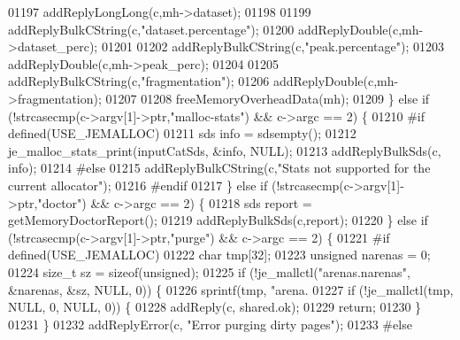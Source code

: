 \begin{DoxyCode}
{{{{01197         addReplyLongLong(c,mh->dataset);
01198 
01199         addReplyBulkCString(c,\textcolor{stringliteral}{"dataset.percentage"});
01200         addReplyDouble(c,mh->dataset\_perc);
01201 
01202         addReplyBulkCString(c,\textcolor{stringliteral}{"peak.percentage"});
01203         addReplyDouble(c,mh->peak\_perc);
01204 
01205         addReplyBulkCString(c,\textcolor{stringliteral}{"fragmentation"});
01206         addReplyDouble(c,mh->fragmentation);
01207 
01208         freeMemoryOverheadData(mh);
01209     \} \textcolor{keywordflow}{else} \textcolor{keywordflow}{if} (!strcasecmp(c->argv[1]->ptr,\textcolor{stringliteral}{"malloc-stats"}) && c->argc == 2) \{
01210 \textcolor{preprocessor}{#}\textcolor{preprocessor}{if} \textcolor{preprocessor}{defined}\textcolor{preprocessor}{(}\textcolor{preprocessor}{USE\_JEMALLOC}\textcolor{preprocessor}{)}
01211         sds info = sdsempty();
01212         je\_malloc\_stats\_print(inputCatSds, &info, NULL);
01213         addReplyBulkSds(c, info);
01214 \textcolor{preprocessor}{#}\textcolor{preprocessor}{else}
01215         addReplyBulkCString(c,\textcolor{stringliteral}{"Stats not supported for the current allocator"});
01216 \textcolor{preprocessor}{#}\textcolor{preprocessor}{endif}
01217     \} \textcolor{keywordflow}{else} \textcolor{keywordflow}{if} (!strcasecmp(c->argv[1]->ptr,\textcolor{stringliteral}{"doctor"}) && c->argc == 2) \{
01218         sds report = getMemoryDoctorReport();
01219         addReplyBulkSds(c,report);
01220     \} \textcolor{keywordflow}{else} \textcolor{keywordflow}{if} (!strcasecmp(c->argv[1]->ptr,\textcolor{stringliteral}{"purge"}) && c->argc == 2) \{
01221 \textcolor{preprocessor}{#}\textcolor{preprocessor}{if} \textcolor{preprocessor}{defined}\textcolor{preprocessor}{(}\textcolor{preprocessor}{USE\_JEMALLOC}\textcolor{preprocessor}{)}
01222         \textcolor{keywordtype}{char} tmp[32];
01223         \textcolor{keywordtype}{unsigned} narenas = 0;
01224         size\_t sz = \textcolor{keyword}{sizeof}(\textcolor{keywordtype}{unsigned});
01225         \textcolor{keywordflow}{if} (!je\_mallctl(\textcolor{stringliteral}{"arenas.narenas"}, &narenas, &sz, NULL, 0)) \{
01226             sprintf(tmp, \textcolor{stringliteral}{"arena.%
01227             \textcolor{keywordflow}{if} (!je\_mallctl(tmp, NULL, 0, NULL, 0)) \{
01228                 addReply(c, shared.ok);
01229                 \textcolor{keywordflow}{return};
01230             \}
01231         \}
01232         addReplyError(c, \textcolor{stringliteral}{"Error purging dirty pages"});
01233 \textcolor{preprocessor}{#}\textcolor{preprocessor}{else}
}}}}}
\end{DoxyCode}
